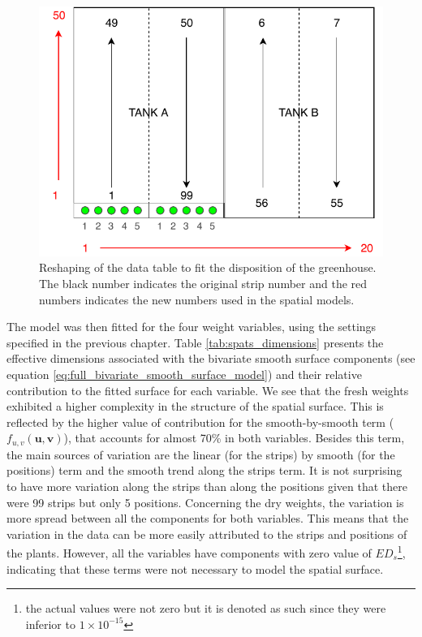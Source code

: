 \begin{figure}[hbtp]
	\centering
	\includegraphics[scale = 0.7]{figures/TANK_repartition.pdf}
	\caption[Reshaping of the data table to fit the disposition of the greenhouse]{Reshaping of the data table to fit the 
	disposition of the greenhouse. The black number indicates the original strip number and the red numbers indicates the new 
	numbers used in the spatial models.}
	\label{fig:tank_disposition}	
\end{figure}

The model was then fitted for the four weight variables, using the settings specified in the previous chapter. Table \ref{tab:spats_dimensions} presents the effective dimensions associated with the bivariate smooth surface components (see equation \ref{eq:full_bivariate_smooth_surface_model}) 
and their relative contribution to the fitted surface for each variable.
We see that the fresh weights exhibited a higher complexity in the structure of the spatial surface. This is reflected by the higher value of contribution for the smooth-by-smooth term ($f_{u, v}(\boldsymbol{u}, \boldsymbol{v})$), that accounts for almost 70\% in both variables. Besides this term, the main sources of variation are the linear (for the strips) by smooth (for the positions) term and the smooth trend along the strips term. It is not surprising to have more variation along the strips than along the positions given that there were 99 strips but only 5 positions.
Concerning the dry weights, the variation is more spread between all the components for both variables. This means that the variation in the data can be more easily attributed to the strips and positions of the plants. However, all the variables have components with zero value of $ED_{s}$\footnote{the actual values were not zero but it is denoted as such since they were inferior to $1 \times 10^{-15}$}, indicating that these terms were not necessary to model the spatial surface.\\

